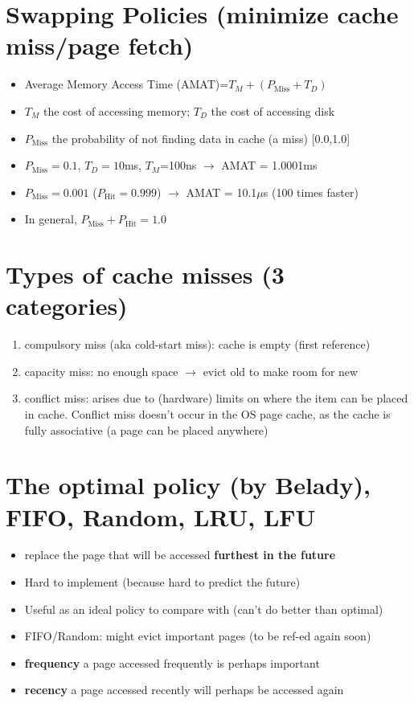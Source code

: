 \section*{Swapping Policies (minimize cache miss/page fetch)}
\begin{itemize}
\item Average Memory Access Time (AMAT)=$T_{M}+(P_{\text{Miss}} + T_{D})$
\item $T_{M}$ the cost of accessing memory; $T_{D}$ the cost of accessing disk
\item $P_{\text{Miss}}$ the probability of not finding  data in cache (a miss) [0.0,1.0]
\item $P_{\text{Miss}} = 0.1$, $T_{D}=10$ms, $T_{M}$=100ns $\to$ AMAT = 1.0001ms
\item $P_{\text{Miss}} = 0.001$ ($P_{\text{Hit}} = 0.999$) $\to$ AMAT = 10.1$\mu$s (100 times faster)
\item In general, $P_{\text{Miss}} + P_{\text{Hit}} = 1.0$
\end{itemize}

\section*{Types of cache misses (3 categories)}
\begin{enumerate}
\item compulsory miss (aka cold-start miss): cache is empty (first reference)
\item capacity miss: no enough space $\to$ evict old to make room for new
\item conflict miss: arises due to (hardware) limits on where the item can be placed in cache.  Conflict miss doesn’t occur in the OS page cache, as the cache is
fully associative (a page can be placed anywhere)
\end{enumerate}

\section*{The optimal policy (by Belady), FIFO, Random, LRU, LFU}
\begin{itemize}
\item replace the page that will be accessed \textbf{furthest in the future}
\item Hard to implement (because hard to predict the future)
\item Useful as an ideal policy to compare with (can't do better than optimal)
\end{itemize}
\begin{itemize}
\item FIFO/Random: might evict important pages (to be ref-ed again soon)
\item \textbf{frequency} a page accessed frequently is perhaps important
\item \textbf{recency} a page accessed recently will perhaps be accessed again
\end{itemize}

